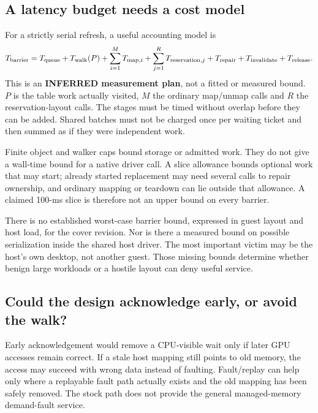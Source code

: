 \subsection{A latency budget needs a cost model}

For a strictly serial refresh, a useful accounting model is
\[
 T_{\rm barrier}=T_{\rm queue}+T_{\rm walk}(P)
  +\sum_{i=1}^{M}T_{{\rm map},i}
  +\sum_{j=1}^{R}T_{{\rm reservation},j}
  +T_{\rm repair}+T_{\rm invalidate}+T_{\rm release}.
\]
This is an \textbf{INFERRED measurement plan}, not a fitted or measured bound. $P$ is the table
work actually visited, $M$ the ordinary map/unmap calls and $R$ the reservation-layout calls.
The stages must be timed without overlap before they can be added. Shared batches must not
be charged once per waiting ticket and then summed as if they were independent work.

\doc Finite object and walker caps bound storage or admitted work. They do not give a
wall-time bound for a native driver call. A slice allowance bounds optional work that may
start; already started replacement may need several calls to repair ownership, and ordinary
mapping or teardown can lie outside that allowance. A claimed 100-ms slice is therefore not
an upper bound on every barrier.

\unmeasured There is no established worst-case barrier bound, expressed in guest layout and
host load, for the cover revision. Nor is there a measured bound on possible serialization
inside the shared host driver. The most important victim may be the host's own desktop, not
another guest. Those missing bounds determine whether benign large workloads or a hostile
layout can deny useful service.

\subsection{Could the design acknowledge early, or avoid the walk?}

\inferred Early acknowledgement would remove a CPU-visible wait only if later GPU accesses
remain correct. If a stale host mapping still points to old memory, the access may succeed
with wrong data instead of faulting. Fault/replay can help only where a replayable fault path
actually exists and the old mapping has been safely removed. The stock path does not provide
the general managed-memory demand-fault service.

